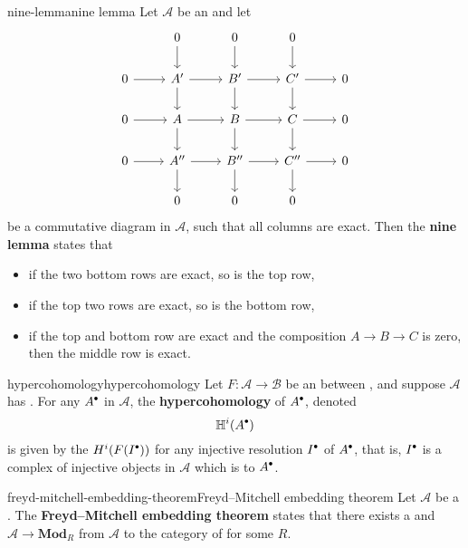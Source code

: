 \begin{topic}{nine-lemma}{nine lemma}
    Let $\mathcal{A}$ be an  and let
    \[ \svg \begin{tikzcd}
        & 0 \arrow{d} & 0 \arrow{d} & 0 \arrow{d} & \\
        0 \arrow{r} & A' \arrow{r} \arrow{d} & B' \arrow{r} \arrow{d} & C' \arrow{r} \arrow{d} & 0 \\
        0 \arrow{r} & A \arrow{r} \arrow{d} & B \arrow{r} \arrow{d} & C \arrow{r} \arrow{d} & 0 \\
        0 \arrow{r} & A'' \arrow{r} \arrow{d} & B'' \arrow{r} \arrow{d} & C'' \arrow{r} \arrow{d} & 0 \\
        & 0 & 0 & 0
    \end{tikzcd} \]
    be a commutative diagram in $\mathcal{A}$, such that all columns are exact. Then the \textbf{nine lemma} states that
    \begin{itemize}
        \item if the two bottom rows are exact, so is the top row,
        \item if the top two rows are exact, so is the bottom row,
        \item if the top and bottom row are exact and the composition $A \to B \to C$ is zero, then the middle row is exact.
    \end{itemize}
\end{topic}

\begin{topic}{hypercohomology}{hypercohomology}
    Let $F \colon \mathcal{A} \to \mathcal{B}$ be an  between , and suppose $\mathcal{A}$ has . For any  $A^\bdot$ in $\mathcal{A}$, the \textbf{hypercohomology} of $A^\bdot$, denoted
    \[ \mathbb{H}^i(A^\bdot) \]
    is given by the  $H^i(F(I^\bdot))$ for any injective resolution $I^\bdot$ of $A^\bdot$, that is, $I^\bdot$ is a complex of injective objects in $\mathcal{A}$ which is  to $A^\bdot$.
\end{topic}

\begin{topic}{freyd-mitchell-embedding-theorem}{Freyd--Mitchell embedding theorem}
    Let $\mathcal{A}$ be a  . The \textbf{Freyd--Mitchell embedding theorem} states that there exists a  and   $\mathcal{A} \to \textbf{Mod}_R$ from $\mathcal{A}$ to the category of  for some  $R$.
\end{topic}

